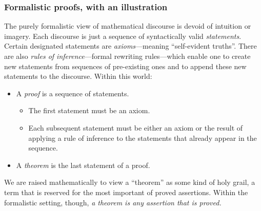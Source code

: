 \subsubsection{Formalistic proofs, with an illustration}
\label{sec:formal-proof}

The purely formalistic view of mathematical discourse is devoid of intuition or imagery.  Each discourse is just a sequence of syntactically valid {\it statements}.  Certain designated statements are {\em axioms}---meaning ``self-evident truths''.  There are also {\em rules of inference}---formal rewriting rules---which enable one to create new statements from sequences of pre-existing ones and to append these new statements to the discourse.  Within this world:
\begin{itemize}
\item
A {\em proof} is a sequence of statements.
  \begin{itemize}
  \item
The first statement must be an axiom.
  \medskip\item
Each subsequent statement must be either an axiom or the result of applying a rule of inference to the statements that already appear in the sequence.
  \end{itemize}
\medskip\item
A {\em theorem} is the last statement of a proof.
\end{itemize}
We are raised mathematically to view a ``theorem'' as some kind of holy grail, a term that is reserved for the most important of proved assertions.  Within the formalistic setting, though, {\em a theorem is any assertion that is proved.}

\bigskip

\noindent {}

